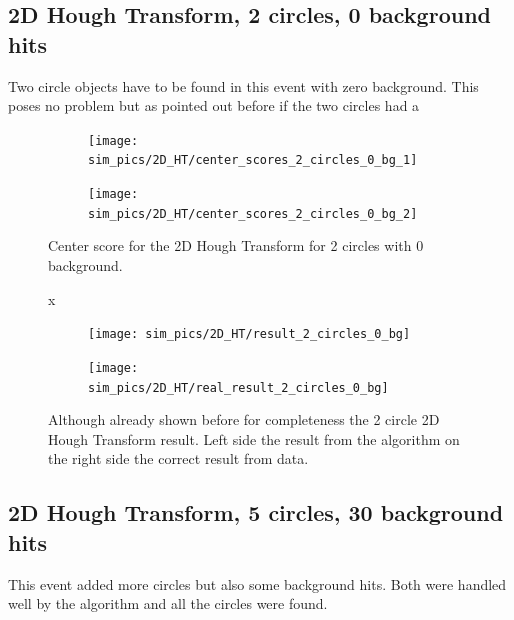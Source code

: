 \documentclass[11pt,twoside]{scrreprt}
\begin{document}
\subsection{2D Hough Transform, 2 circles, 0 background hits} %
\label{sub:2d_hough_transform_2_circles_0_background}
Two circle objects have to be found in this event with zero background. This
poses no problem but as pointed out before if the two circles had a 
\begin{figure}[htp]
        \centering
        \begin{subfigure}[t]{0.5\textwidth}
                \centering
                \texttt{[image: sim\_pics/2D\_HT/center\_scores\_2\_circles\_0\_bg\_1]}
        \end{subfigure}%
        \begin{subfigure}[t]{0.5\textwidth}
                \centering
                \texttt{[image: sim\_pics/2D\_HT/center\_scores\_2\_circles\_0\_bg\_2]}
        \end{subfigure}
        \caption{Center score for the 2D Hough Transform for 2 circles with 0 background.}\label{fig:2d_ht_center}
x
        \begin{subfigure}[t]{0.5\textwidth}
                \centering
                \texttt{[image: sim\_pics/2D\_HT/result\_2\_circles\_0\_bg]}
        \end{subfigure}%
        \begin{subfigure}[t]{0.5\textwidth}
                \centering
                \texttt{[image: sim\_pics/2D\_HT/real\_result\_2\_circles\_0\_bg]}
        \end{subfigure}
\caption{Although already shown before for completeness the 2 circle 2D Hough Transform result. Left side the result from the algorithm on the right side the correct result from data.}
\end{figure}


\clearpage
\subsection{2D Hough Transform, 5 circles, 30 background hits} %
\label{sub:2d_hough_transform_5_circles_30_background_hits}

This event added more circles but also some background hits. Both were handled
well by the algorithm and all the circles were found.
\end{document}
